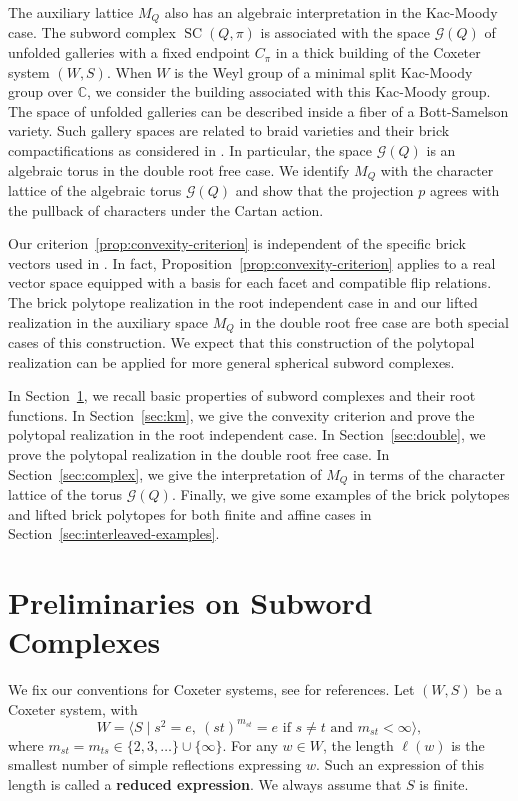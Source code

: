 \documentclass[11pt,a4paper]{article}
\theoremstyle{definition}
\theoremstyle{remark}
\numberwithin{equation}{section}
\newcommand{\SCQ}{\operatorname{SC}(Q,\pi)}
\begin{document}
The auxiliary lattice $M_Q$ also has an algebraic interpretation in the Kac-Moody case. The subword complex $\SCQ$ is associated with the space $\mathcal G(Q)$ of unfolded galleries with a fixed endpoint $C_{\pi}$ in a thick building of the Coxeter system $(W,S)$. When $W$ is the Weyl group of a minimal split Kac-Moody group over $\mathbb C$, we consider the building associated with this Kac-Moody group. The space of unfolded galleries can be described inside a fiber of a Bott-Samelson variety. Such gallery spaces are related to braid varieties and their brick compactifications as considered in \cite{EscobarBrick,CGGLSC,BGS}. In particular, the space $\mathcal G(Q)$ is an algebraic torus in the double root free case. We identify $M_Q$ with the character lattice of the algebraic torus $\mathcal G(Q)$ and show that the projection $p$ agrees with the pullback of characters under the Cartan action. 

Our criterion~\ref{prop:convexity-criterion} is independent of the specific brick vectors used in \cite{JS}. In fact, Proposition~\ref{prop:convexity-criterion} applies to a real
vector space equipped with a basis for each facet and compatible flip relations. The brick polytope realization in the root independent case in \cite{JS} and our lifted realization in the auxiliary space $M_Q$ in the double root free case are both special cases of this construction. We expect that this construction of the polytopal realization can be applied for more general spherical subword complexes.

In Section~\ref{sec:coxeter}, we recall basic properties of subword complexes and their root functions. In Section~\ref{sec:km}, we give the convexity criterion and prove the polytopal realization in the root independent case. In Section~\ref{sec:double}, we prove the polytopal realization in the double root free case. In Section~\ref{sec:complex}, we give the interpretation of $M_Q$ in terms of the character lattice of the torus $\mathcal G(Q)$. Finally, we give some examples of the brick polytopes and lifted brick polytopes for both finite and affine cases in Section~\ref{sec:interleaved-examples}.





\section{Preliminaries on Subword Complexes}
\label{sec:coxeter}

We fix our conventions for Coxeter systems, see \cite{Hum,Kac,Kumar} for references. Let $(W,S)$ be a Coxeter system, with
\[
 W=\langle S\mid s^2=e,\ (st)^{m_{st}}=e
       \text{ if }s\ne t\text{ and }m_{st}<\infty\rangle,
\]
where $m_{st}=m_{ts}\in\{2,3,\ldots\}\cup\{\infty\}$.
For any $w\in W$, the length $\ell(w)$ is the smallest number of simple reflections expressing $w$. Such an expression of this length is called a \textbf{reduced expression}.
We always assume that $S$ is finite.
\end{document}

